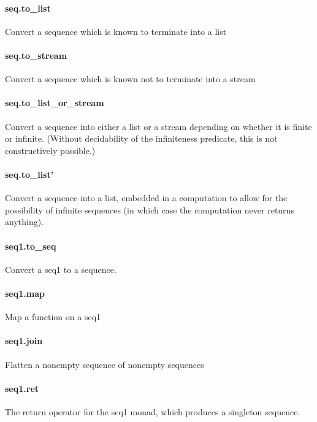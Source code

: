 \documentclass{article}
\begin{document}
\paragraph{seq.to\_list}
\par
Convert a sequence which is known to terminate into a list
\paragraph{seq.to\_stream}
\par
Convert a sequence which is known not to terminate into a stream
\paragraph{seq.to\_list\_or\_stream}
\par
Convert a sequence into either a list or a stream depending on whether
it is finite or infinite. (Without decidability of the infiniteness predicate,
this is not constructively possible.)
\paragraph{seq.to\_list'}
\par
Convert a sequence into a list, embedded in a computation to allow for
the possibility of infinite sequences (in which case the computation
never returns anything).
\paragraph{seq1.to\_seq}
\par
Convert a 
\colorbox[RGB]{253,246,227}{{{{\color[RGB]{101, 123, 131} seq1 }}}} to a sequence.
\paragraph{seq1.map}
\par
Map a function on a 
\colorbox[RGB]{253,246,227}{{{{\color[RGB]{101, 123, 131} seq1 }}}}\paragraph{seq1.join}
\par
Flatten a nonempty sequence of nonempty sequences
\paragraph{seq1.ret}
\par
The 
\colorbox[RGB]{253,246,227}{{{{\color[RGB]{101, 123, 131} return }}}} operator for the 
\colorbox[RGB]{253,246,227}{{{{\color[RGB]{101, 123, 131} seq1 }}}} monad,
which produces a singleton sequence.
\end{document}
